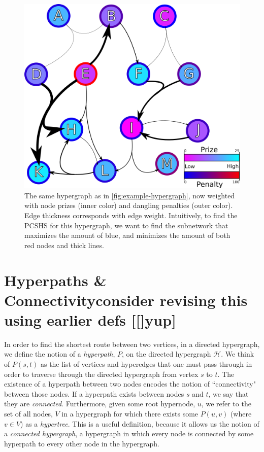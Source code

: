 \documentclass[12pt,twoside]{reedthesis}
\newcommand{\new}[2]{{\color{purple}#1 [#2]}}
\theoremstyle{definition}
\begin{document}
\begin{figure}[thbp]
  \begin{center}
    \includegraphics{example-hypergraph-weighted}
  \caption[A weighted hypergraph]{The same hypergraph as in \ref{fig:example-hypergraph}, now weighted with node prizes (inner color) and dangling penalties (outer color). Edge thickness corresponds with edge weight. Intuitively, to find the PCSHS for this hypergraph, we want to find the subnetwork that maximizes the amount of blue, and minimizes the amount of both red nodes and thick lines.}
  \label{fig:example-hypergraph-weighted}
  \end{center}
\end{figure}

\section{Hyperpaths \& Connectivity\new{consider revising this using earlier defs}[yup]}
In order to find the shortest route between two vertices, in a directed hypergraph, we define the notion of a \textit{hyperpath}, $P$, on the directed hypergraph $\mathcal{H}$.  We think of $P(s,t)$ as the list of vertices and hyperedges that one must pass through in order to traverse through the directed hypergraph from vertex $s$ to $t$. The existence of a hyperpath between two nodes encodes the notion of ``connectivity" between those nodes.  If a hyperpath exists between nodes $s$ and $t$, we say that they are \textit{connected}. Furthermore, given some root hypernode, $u$, we refer to the set of all nodes, $V$ in a hypergraph for which there exists some $P(u,v)$ (where $v \in V$) as a \textit{hypertree}. This is a useful definition, because it allows us the notion of a \textit{connected hypergraph}, a hypergraph in which every node is connected by some hyperpath to every other node in the hypergraph.\par
\end{document}

